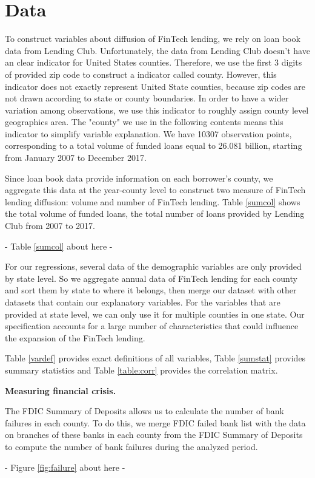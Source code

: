 \documentclass[11pt, a4paper, leqno]{article}
\begin{document}
\section{Data}
To construct variables about diffusion of FinTech lending, we rely on loan book data from Lending Club. Unfortunately, the data from Lending Club doesn't have an clear indicator for United States counties. Therefore, we use the first 3 digits of provided zip code to construct a indicator called county. However, this indicator does not exactly represent United State counties, because zip codes are not drawn according to state or county boundaries. In order to have a wider variation among observations, we use this indicator to roughly assign county level geographics area. The "county" we use in the following contents means this indicator to simplify variable explanation. We have 10307 observation points, corresponding to a total volume of funded loans equal to 26.081 billion, starting from January 2007 to December 2017. 

Since loan book data provide information on each borrower's county, we aggregate this data at the year-county level to construct two measure of FinTech lending diffusion: volume and number of FinTech lending.
Table \ref{sumcol} shows the total volume of funded loans, the total number of loans provided by Lending Club from 2007 to 2017.
\begin{center}
- Table \ref{sumcol} about here -
\end{center}

For our regressions, several data of the demographic variables are only provided by state level. So we aggregate annual data of FinTech lending for each county and sort them by state to where it belongs, then merge our dataset with other datasets that contain our explanatory variables. For the variables that are provided at state level, we can only use it for multiple counties in one state.  Our specification accounts for a large number of characteristics that could influence the expansion of the FinTech lending. 

Table \ref{vardef} provides exact definitions of all variables, Table \ref{sumstat} provides summary statistics and Table \ref{table:corr} provides the correlation matrix.
 
\textbf{Measuring financial crisis.}

The FDIC Summary of Deposits allows us to calculate the number of bank failures in each county. To do this, we merge FDIC failed bank list with the data on branches of these banks in each county from the FDIC Summary of Deposits to compute the number of bank failures during the analyzed period. 
\begin{center}
- Figure \ref{fig:failure} about here -
\end{center}
\end{document}
